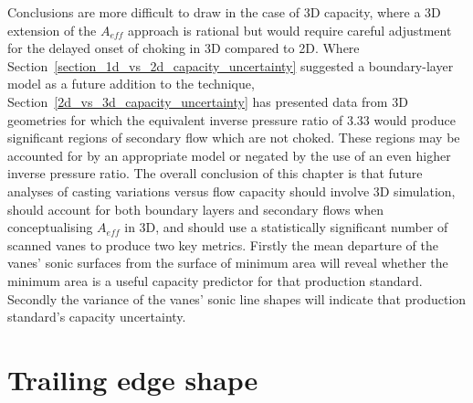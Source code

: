 \documentclass[a4paper, 11pt, oneside]{report}
\begin{document}
Conclusions are more difficult to draw in the case of 3D capacity, where a 3D extension of the $A_{eff}$ approach is rational but would require careful adjustment for the delayed onset of choking in 3D compared to 2D. Where Section~\ref{section_1d_vs_2d_capacity_uncertainty} suggested a boundary-layer model as a future addition to the technique, Section~\ref{2d_vs_3d_capacity_uncertainty} has presented data from 3D geometries for which the equivalent inverse pressure ratio of $3.33$ would produce significant regions of secondary flow which are not choked. These regions may be accounted for by an appropriate model or negated by the use of an even higher inverse pressure ratio. The overall conclusion of this chapter is that future analyses of casting variations versus flow capacity should involve 3D simulation, should account for both boundary layers and secondary flows when conceptualising $A_{eff}$ in 3D, and should use a statistically significant number of scanned vanes to produce two key metrics. Firstly the mean departure of the vanes' sonic surfaces from the surface of minimum area will reveal whether the minimum area is a useful capacity predictor for that production standard. Secondly the variance of the vanes' sonic line shapes will indicate that production standard's capacity uncertainty.


\chapter{Trailing edge shape}
\label{chapter_trailing_edge}


\end{document}
